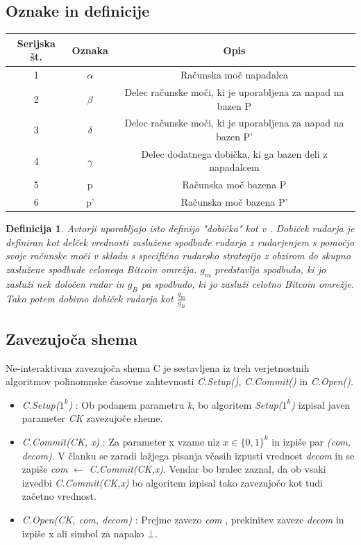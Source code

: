 \documentclass[12pt]{article}
\newtheorem{definicija}{Definicija}
\begin{document}
\subsection{Oznake in definicije}
\begin{center}
	
	\begin{tabular} {| c | c | c |}
		\hline
		Serijska št. & Oznaka  & Opis \\ \hline
		1 & $\alpha$ & Računska moč napadalca \\  \hline
		2 & $\beta$ & Delec računske moči, ki je uporabljena za napad na bazen  P \\  \hline
		3 & $\delta$ & Delec  računske moči, ki je uporabljena za napad na bazen P' \\  \hline
		4 & $\gamma$ & Delec dodatnega dobička, ki ga bazen deli z napadalcem \\  \hline
		5 & p & Računska moč bazena P  \\ \hline
		6 & p' & Računska moč bazena P'  \\ \hline
	\end{tabular}
\end{center}

\begin{definicija}
	 Avtorji \cite{originalarticle} uporabljajo isto definijo "dobička" kot v \cite{powersplitting}. Dobiček rudarja je definiran kot delček vrednosti zaslužene spodbude rudarja z rudarjenjem s pomočjo svoje računske moči v skladu s specifično rudarsko strategijo z obzirom do skupno zaslužene spodbude celonega Bitcoin omrežja. $g_m$ predstavlja spodbudo, ki jo zasluži nek določen rudar in $g_B$ pa spodbudo, ki jo zasluži celotno Bitcoin omrežje. Tako potem dobimo dobiček rudarja kot $\frac{g_m}{g_B}$
\end{definicija} 

\subsection{Zavezujoča shema}
Ne-interaktivna zavezujoča shema \cite{datamininglectures} C je sestavljena iz treh verjetnostnih algoritmov polinomnske časovne zahtevnosti \textit{C.Setup()}, \textit{C.Commit()} in \textit{C.Open()}.
\begin{itemize}
	\item \textit{C.Setup($1^k$)} : Ob podanem parametru \textit{k}, bo algoritem \textit{Setup($1^k$)} izpisal javen parameter \textit{CK} zavezujoče sheme.
	\item \textit{C.Commit(CK, x)} : Za parameter x vzame niz $x \in \{0,1\}^k$ in izpiše par  \textit{(com, decom)}. V članku \cite{originalarticle} se zaradi lažjega pisanja včasih izpusti vrednost \textit{decom} in se zapiše  \textit{com} $\leftarrow$ \textit{C.Commit(CK,x)}. Vendar bo bralec zaznal, da ob vsaki izvedbi \textit{C.Commit(CK,x)} bo algoritem izpisal tako zavezujočo kot tudi začetno vrednost.
	\item \textit{C.Open(CK, com, decom)} : Prejme zavezo \textit{com} , prekinitev zaveze \textit{decom} in izpiše x ali simbol za napako $\bot$.
\end{itemize}
\end{document}
